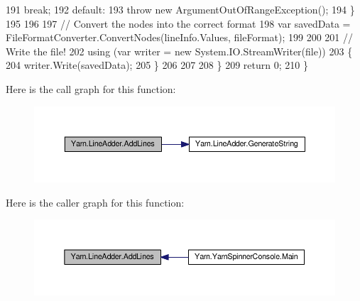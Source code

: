 \begin{DoxyCode}
191                         \textcolor{keywordflow}{break};
192                     \textcolor{keywordflow}{default}:
193                         \textcolor{keywordflow}{throw} \textcolor{keyword}{new} ArgumentOutOfRangeException();
194                 \}
195 
196 
197                 \textcolor{comment}{// Convert the nodes into the correct format}
198                 var savedData = FileFormatConverter.ConvertNodes(lineInfo.Values, fileFormat);
199 
200 
201                 \textcolor{comment}{// Write the file!}
202                 \textcolor{keyword}{using} (var writer = \textcolor{keyword}{new} System.IO.StreamWriter(file))
203                 \{
204                     writer.Write(savedData);
205                 \}
206 
207 
208             \}
209             \textcolor{keywordflow}{return} 0;
210         \}
\end{DoxyCode}


Here is the call graph for this function\-:
\nopagebreak
\begin{figure}[H]
\begin{center}
\leavevmode
\includegraphics[width=350pt]{a00130_aa2b8af349e709b8a45d42af5146ca848_cgraph}
\end{center}
\end{figure}




Here is the caller graph for this function\-:
\nopagebreak
\begin{figure}[H]
\begin{center}
\leavevmode
\includegraphics[width=350pt]{a00130_aa2b8af349e709b8a45d42af5146ca848_icgraph}
\end{center}
\end{figure}



